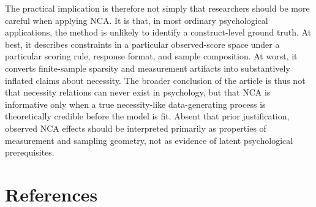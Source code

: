 \documentclass[
  man,
  longtable,
  nolmodern,
  notxfonts,
  notimes,
  colorlinks=true,linkcolor=blue,citecolor=blue,urlcolor=blue]{apa7}
\begin{document}
The practical implication is therefore not simply that researchers
should be more careful when applying NCA. It is that, in most ordinary
psychological applications, the method is unlikely to identify a
construct-level ground truth. At best, it describes constraints in a
particular observed-score space under a particular scoring rule,
response format, and sample composition. At worst, it converts
finite-sample sparsity and measurement artifacts into substantively
inflated claims about necessity. The broader conclusion of the article
is thus not that necessity relations can never exist in psychology, but
that NCA is informative only when a true necessity-like data-generating
process is theoretically credible before the model is fit. Absent that
prior justification, observed NCA effects should be interpreted
primarily as properties of measurement and sampling geometry, not as
evidence of latent psychological prerequisites.

\section{References}\label{references}
\end{document}

